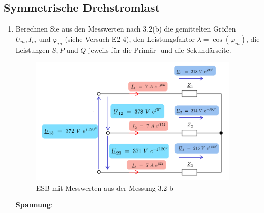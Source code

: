 \subsection{Symmetrische Drehstromlast}
\begin{enumerate}[label=\alph*)]

	\item Berechnen Sie aus den Messwerten nach 3.2(b) die gemittelten Größen $U_m, I_m
		      \text{ und } \varphi_m$ (siehe Versuch E2-4), den Leistungsfaktor $\lambda =
		      \cos(\varphi_m)$, die Leistungen $S, P \text{ und } Q$ jeweils für die Primär-
	      und die Sekundärseite.

	      \begin{figure}[h!]
		      \begin{center}
			      \includegraphics[width=0.95\textwidth]{img/4.2.1.1}
		      \end{center}
		      \caption{ESB mit Messwerten aus der Messung 3.2 b}\label{img:4.2.1.1}
	      \end{figure}
	      \textbf{Spannung}:\\\ \\
	      \begin{tcolorbox}[colback=gray!30,
			      colframe=black,
			      width=0.9\textwidth ]
		      \parbox{\textwidth}{

}
\end{tcolorbox}
\end{enumerate}
